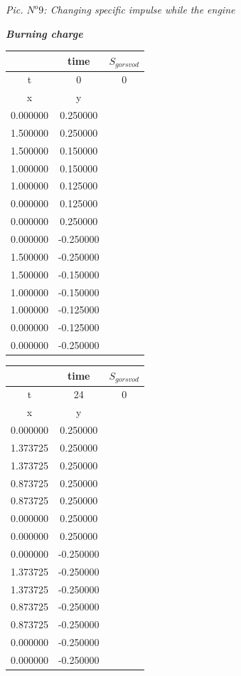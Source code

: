 \begin{flushright}
\textit{ Pic. $N^o 9$: Changing specific impulse while the engine } \\
\end{flushright}
\newpage

\begin{center}
\begin{large}
\textbf{\textit { Burning charge }} \\
\end{large}
\end{center}
\begin{center}
\begin{tabular}{|c|c|c|}
\hline
  & time & $S_{gor svod}$  \\
\hline
t & 0 & 0  \\
\hline
x & y &   \\
\hline
0.000000 &  0.250000 &  \\
\hline
1.500000 &  0.250000 &  \\
\hline
1.500000 &  0.150000 &  \\
\hline
1.000000 &  0.150000 &  \\
\hline
1.000000 &  0.125000 &  \\
\hline
0.000000 &  0.125000 &  \\
\hline
0.000000 &  0.250000 &  \\
\hline
0.000000 &  -0.250000 &  \\
\hline
1.500000 &  -0.250000 &  \\
\hline
1.500000 &  -0.150000 &  \\
\hline
1.000000 &  -0.150000 &  \\
\hline
1.000000 &  -0.125000 &  \\
\hline
0.000000 &  -0.125000 &  \\
\hline
0.000000 &  -0.250000 &  \\
\hline
\end{tabular}
\begin{tabular}{|c|c|c|}
\hline
  & time & $S_{gor svod}$  \\
\hline
t & 24 & 0  \\
\hline
x & y &   \\
\hline
0.000000 &  0.250000 &  \\
\hline
1.373725 &  0.250000 &  \\
\hline
1.373725 &  0.250000 &  \\
\hline
0.873725 &  0.250000 &  \\
\hline
0.873725 &  0.250000 &  \\
\hline
0.000000 &  0.250000 &  \\
\hline
0.000000 &  0.250000 &  \\
\hline
0.000000 &  -0.250000 &  \\
\hline
1.373725 &  -0.250000 &  \\
\hline
1.373725 &  -0.250000 &  \\
\hline
0.873725 &  -0.250000 &  \\
\hline
0.873725 &  -0.250000 &  \\
\hline
0.000000 &  -0.250000 &  \\
\hline
0.000000 &  -0.250000 &  \\
\hline
\end{tabular}
\end{center}
